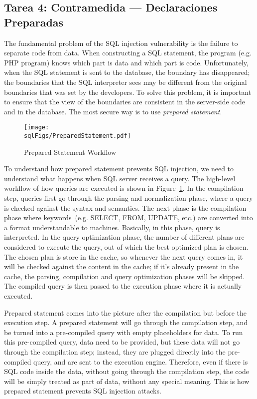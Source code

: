 \subsection{Tarea 4: Contramedida --- Declaraciones Preparadas} 

The fundamental problem of the SQL injection vulnerability is the failure to
separate code from data. When constructing a SQL statement, the program
(e.g. PHP program) knows which part is data and which part is code.
Unfortunately, when the SQL statement is sent to the database, the boundary
has disappeared; the boundaries that the SQL interpreter sees may be
different from the original boundaries that was set by the developers.
To solve this problem, it is important to ensure that the view
of the boundaries are consistent in the server-side code and in the
database.  The most secure way is to use 
\textit{prepared statement}. 

\begin{figure}
\centering
\texttt{[image: \\sqlFigs/PreparedStatement.pdf]}
\caption{Prepared Statement Workflow}
\label{sql:fig:preparedstatement}
\end{figure}


To understand how prepared statement prevents SQL injection, 
we need to understand what happens when SQL server receives a query. 
The high-level workflow of how queries are executed is shown in Figure~\ref{sql:fig:preparedstatement}.
In the compilation step, queries first go through the parsing and normalization phase, 
where a query is checked against the syntax and semantics. 
The next phase is the compilation phase where keywords~(e.g. SELECT, FROM, UPDATE, etc.) 
are converted into a format understandable to machines. 
Basically, in this phase, query is interpreted.
In the query optimization phase, the number of different plans are considered to 
execute the query,  out of which the best optimized plan is chosen. 
The chosen plan is store in the cache, so 
whenever the next query comes in, 
it will be checked against the content in the cache; if it's already present in the cache,
the parsing, compilation and query optimization phases will be skipped. 
The compiled query is then passed to the execution phase 
where it is actually executed.


Prepared statement comes into the picture after the compilation but before the execution step. 
A prepared statement will go through the compilation step, and be turned into
a pre-compiled query with empty placeholders for data. To run this pre-compiled query,
data need to be provided, but these data will not go through the compilation step; instead,
they are plugged directly into the pre-compiled query, and are sent to the execution engine.
Therefore, even if there is SQL code inside the data, without going through the compilation
step, the code will be simply treated as part of data, without any special meaning.  
This is how prepared statement prevents SQL injection attacks.


